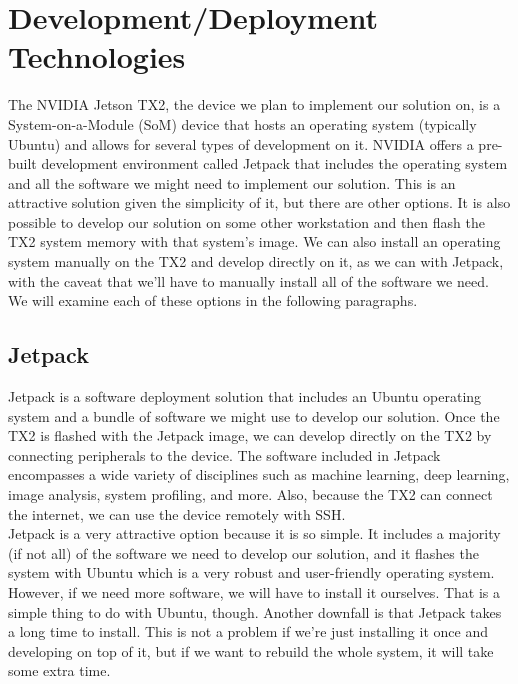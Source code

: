\section{Development/Deployment Technologies}
The NVIDIA Jetson TX2, the device we plan to implement our solution on, is a System-on-a-Module (SoM) device that hosts an operating system (typically Ubuntu) and allows for several types of development on it. NVIDIA offers a pre-built development environment called Jetpack that includes the operating system and all the software we might need to implement our solution. This is an attractive solution given the simplicity of it, but there are other options. It is also possible to develop our solution on some other workstation and then flash the TX2 system memory with that system's image. We can also install an operating system manually on the TX2 and develop directly on it, as we can with Jetpack, with the caveat that we'll have to manually install all of the software we need. We will examine each of these options in the following paragraphs.

\subsection{Jetpack}
Jetpack is a software deployment solution that includes an Ubuntu operating system and a bundle of software we might use to develop our solution. Once the TX2 is flashed with the Jetpack image, we can develop directly on the TX2 by connecting peripherals to the device. The software included in Jetpack encompasses a wide variety of disciplines such as machine learning, deep learning, image analysis, system profiling, and more. Also, because the TX2 can connect the internet, we can use the device remotely with SSH.\\

Jetpack is a very attractive option because it is so simple. It includes a majority (if not all) of the software we need to develop our solution, and it flashes the system with Ubuntu which is a very robust and user-friendly operating system. However, if we need more software, we will have to install it ourselves. That is a simple thing to do with Ubuntu, though. Another downfall is that Jetpack takes a long time to install. This is not a problem if we're just installing it once and developing on top of it, but if we want to rebuild the whole system, it will take some extra time.

